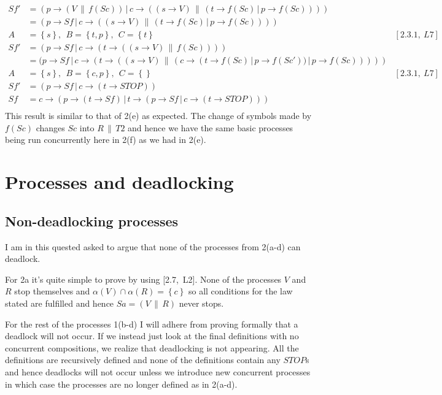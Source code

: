 \documentclass[11pt,a4paper]{article}
\def\ra{\rightarrow}
\def\cc{\,\|\,}
\def\ch{\,|\,}
\newcommand{\sN}[1]{\left \lbrace #1 \right \rbrace}
\begin{document}
\begin{align*}
    Sf'   &= (p \ra (V \cc f(Sc))  \ch c \ra ((s \ra V) \cc
             (t \ra f(Sc) \ch p \ra f(Sc)))) & \\
          &= (p \ra Sf  \ch c \ra ((s \ra V) \cc
             (t \ra f(Sc) \ch p \ra f(Sc)))) & \\
        A &= \sN{s},~~ B = \sN{t,p},~~ C = \sN{t} & [2.3.1,~L7] \\
    Sf'   &= (p \ra Sf  \ch
              c \ra (t \ra ((s \ra V) \cc f(Sc)))) & \\
          &= (p \ra Sf  \ch
              c \ra (t \ra ((s \ra V) \cc
                            (c \ra (t \ra f(Sc) \ch p \ra f(Sc')) \ch p \ra f(Sc))))) & \\
        A &= \sN{s},~~ B = \sN{c,p},~~ C = \sN{ } & [2.3.1,~L7] \\
    Sf'   &= (p \ra Sf \ch c \ra (t \ra STOP)) & \\
    Sf &= c \ra (p \ra (t \ra Sf)
            \ch t \ra  (p \ra Sf \ch c \ra (t \ra STOP))) & \\
\end{align*}
This result is similar to that of 2(e) as expected. The change of symbols made
by $f(Sc)$ changes $Sc$ into $R \cc T2$ and hence we have the same basic
processes being run concurrently here in 2(f) as we had in 2(e).

\section{Processes and deadlocking}

\subsection{Non-deadlocking processes}
I am in this quested asked to argue that none of the processes from 2(a-d) can
deadlock.

For 2a it's quite simple to prove by using [2.7,~L2]. None of the
processes $V$ and $R$ stop themselves and $\alpha(V) \cap \alpha(R) = \sN{c}$ so
all conditions for the law stated are fulfilled and hence $Sa = (V \cc R)$ never
stops.

For the rest of the processes 1(b-d) I will adhere from proving formally that a
deadlock will not occur. If we instead just look at the final definitions with
no concurrent compositions, we realize that deadlocking is not appearing. All
the definitions are recursively defined and none of the definitions contain any
$STOP$s and hence deadlocks will not occur unless we introduce new concurrent
processes in which case the processes are no longer defined as in 2(a-d).
\end{document}
